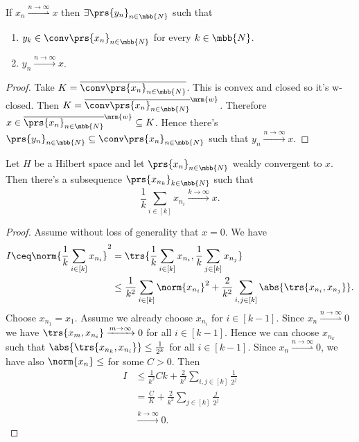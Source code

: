 \documentclass[10pt, twoside]{book}
\begin{document}
\begin{corollary}[Mazur]
If $x_n \overset{n\to\infty}{\rightharpoonup} x$ then $\exists \prs{y_n}_{n \in \mbb{N}}$ such that
\begin{enumerate}
\item $y_k \in \conv\prs{x_n}_{n \in \mbb{N}}$ for every $k \in \mbb{N}$.
\item $y_n \xrightarrow{n\to\infty} x$.
\end{enumerate}
\end{corollary}

\begin{proof}
Take $K = \overline{\conv\prs{x_n}_{n \in \mbb{N}}}$. This is convex and closed so it's w-closed. Then $K = \overline{\conv\prs{x_n}_{n \in \mbb{N}}}^{\mrm{w}}$. Therefore $x \in \overline{\prs{x_n}_{n \in \mbb{N}}}^{\mrm{w}} \subseteq K$. Hence there's $\prs{y_n}_{n \in \mbb{N}} \subseteq \conv\prs{x_n}_{n \in \mbb{N}}$ such that $y_n \xrightarrow{n\to\infty} x$.
\end{proof}

\begin{theorem}\label{theorem:banach_saks_1}
Let $H$ be a Hilbert space and let $\prs{x_n}_{n \in \mbb{N}}$ weakly convergent to $x$. Then there's a subsequence $\prs{x_{n_k}}_{k \in \mbb{N}}$ such that
\[\frac{1}{k} \sum_{i \in [k]} x_{n_i} \xrightarrow{k\to\infty} x \text{.}\]
\end{theorem}

\begin{proof}
Assume without loss of generality that $x = 0$.
We have
\begin{align*}
I \ceq \norm{\frac{1}{k} \sum_{i \in [k]} x_{n_i}}^2 &= \trs{\frac{1}{k} \sum_{i \in [k]} x_{n_i}, \frac{1}{k} \sum_{j \in [k]} x_{n_j}}
\\&\leq \frac{1}{k^2} \sum_{i \in [k]} \norm{x_{n_i}}^2 + \frac{2}{k^2} \sum_{i,j \in [k]} \abs{\trs{x_{n_i}, x_{n_j}}} \text{.}
\end{align*}
Choose $x_{n_1} = x_1$. Assume we already choose $x_{n_i}$ for $i \in [k-1]$. Since $x_n \overset{n\to\infty}{\rightharpoonup} 0$ we have $\trs{x_m, x_{n_i}} \xrightarrow{m\to\infty} 0$ for all $i \in [k-1]$. Hence we can choose $x_{n_k}$ such that $\abs{\trs{x_{n_k}, x_{n_i}}} \leq \frac{1}{2^k}$ for all $i \in [k-1]$. Since $x_n \overset{n\to\infty}{\rightharpoonup} 0$, we have also $\norm{x_n} \leq $ for some $C > 0$.
Then
\begin{align*}
I &\leq \frac{1}{k^2} C k + \frac{2}{k^2} \sum_{i,j \in [k]} \frac{1}{2^j}
\\&= \frac{C}{K} + \frac{2}{k^2} \sum_{j \in [k]} \frac{j}{2^j}
\\&\xrightarrow{k\to\infty} 0 \text{.}
\end{align*}
\end{proof}
\end{document}
